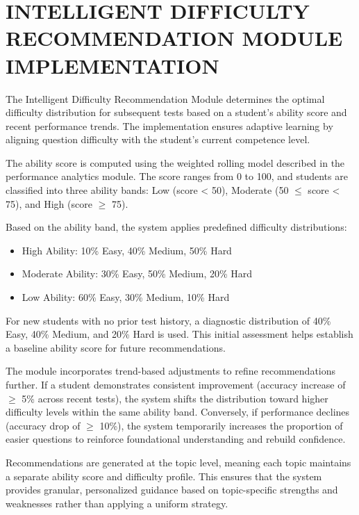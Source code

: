 \begin{sloppypar}
\section{\MakeUppercase{INTELLIGENT DIFFICULTY RECOMMENDATION MODULE IMPLEMENTATION}}

The Intelligent Difficulty Recommendation Module determines the optimal difficulty distribution for subsequent tests based on a student's ability score and recent performance trends. The implementation ensures adaptive learning by aligning question difficulty with the student's current competence level.

The ability score is computed using the weighted rolling model described in the performance analytics module. The score ranges from 0 to 100, and students are classified into three ability bands: Low (score < 50), Moderate (50 $\leq$ score < 75), and High (score $\geq$ 75).

Based on the ability band, the system applies predefined difficulty distributions:

\begin{itemize}
\item High Ability: 10\% Easy, 40\% Medium, 50\% Hard
\item Moderate Ability: 30\% Easy, 50\% Medium, 20\% Hard
\item Low Ability: 60\% Easy, 30\% Medium, 10\% Hard
\end{itemize}

For new students with no prior test history, a diagnostic distribution of 40\% Easy, 40\% Medium, and 20\% Hard is used. This initial assessment helps establish a baseline ability score for future recommendations.

The module incorporates trend-based adjustments to refine recommendations further. If a student demonstrates consistent improvement (accuracy increase of $\geq$ 5\% across recent tests), the system shifts the distribution toward higher difficulty levels within the same ability band. Conversely, if performance declines (accuracy drop of $\geq$ 10\%), the system temporarily increases the proportion of easier questions to reinforce foundational understanding and rebuild confidence.

Recommendations are generated at the topic level, meaning each topic maintains a separate ability score and difficulty profile. This ensures that the system provides granular, personalized guidance based on topic-specific strengths and weaknesses rather than applying a uniform strategy.


\end{sloppypar}
